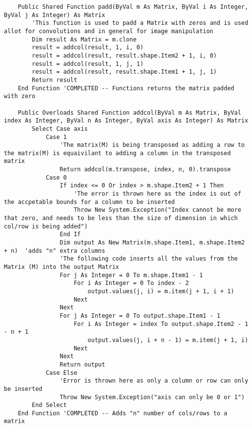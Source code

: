 \begin{verbatim}
    Public Shared Function padd(ByVal m As Matrix, ByVal i As Integer, ByVal j As Integer) As Matrix
        'This function is used to padd a Matrix with zeros and is used allot for convolutions and in general for image manipulation
        Dim result As Matrix = m.clone
        result = addcol(result, 1, i, 0)
        result = addcol(result, result.shape.Item2 + 1, i, 0)
        result = addcol(result, 1, j, 1)
        result = addcol(result, result.shape.Item1 + 1, j, 1)
        Return result
    End Function 'COMPLETED -- Functions returns the matrix padded with zero

    Public Overloads Shared Function addcol(ByVal m As Matrix, ByVal index As Integer, ByVal n As Integer, ByVal axis As Integer) As Matrix
        Select Case axis
            Case 1
                'The matrix(M) is being transposed as adding a row to the matrix(M) is equaivilant to adding a column in the transposed matrix
                Return addcol(m.transpose, index, n, 0).transpose
            Case 0
                If index <= 0 Or index > m.shape.Item2 + 1 Then
                    'The error is thrown here as the index is out of the accpetable bounds for a column to be inserted
                    Throw New System.Exception("Index cannot be more that zero, and needs to be less than the size of dimension in which col/row is being added")
                End If
                Dim output As New Matrix(m.shape.Item1, m.shape.Item2 + n)  'adds "n" extra columns
                'The following code inserts all the values from the Matrix (M) into the output Matrix
                For j As Integer = 0 To m.shape.Item1 - 1
                    For i As Integer = 0 To index - 2
                        output.values(j, i) = m.item(j + 1, i + 1)
                    Next
                Next
                For j As Integer = 0 To output.shape.Item1 - 1
                    For i As Integer = index To output.shape.Item2 - 1 - n + 1
                        output.values(j, i + n - 1) = m.item(j + 1, i)
                    Next
                Next
                Return output
            Case Else
                'Error is thrown here as only a column or row can only be inserted
                Throw New System.Exception("axis can only be 0 or 1")
        End Select
    End Function 'COMPLETED -- Adds "n" number of cols/rows to a matrix


\end{verbatim}
